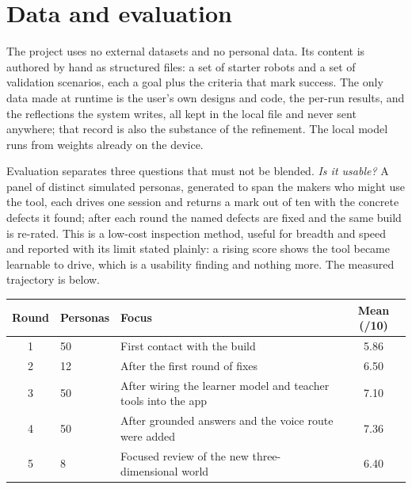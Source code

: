 \documentclass[10.5pt]{article}
\begin{document}
\section{Data and evaluation}
The project uses no external datasets and no personal data. Its content is authored by hand as structured files: a set of starter robots and a set of validation scenarios, each a goal plus the criteria that mark success. The only data made at runtime is the user's own designs and code, the per-run results, and the reflections the system writes, all kept in the local file and never sent anywhere; that record is also the substance of the refinement. The local model runs from weights already on the device.

Evaluation separates three questions that must not be blended. \emph{Is it usable?} A panel of distinct simulated personas, generated to span the makers who might use the tool, each drives one session and returns a mark out of ten with the concrete defects it found; after each round the named defects are fixed and the same build is re-rated. This is a low-cost inspection method, useful for breadth and speed and reported with its limit stated plainly: a rising score shows the tool became learnable to drive, which is a usability finding and nothing more. The measured trajectory is below.

\begin{table}[h]
\centering\small
\begin{tabular}{clp{7.2cm}c}
\toprule
Round & Personas & Focus & Mean (/10) \\
\midrule
1 & 50 & First contact with the build & 5.86 \\
2 & 12 & After the first round of fixes & 6.50 \\
3 & 50 & After wiring the learner model and teacher tools into the app & 7.10 \\
4 & 50 & After grounded answers and the voice route were added & 7.36 \\
5 & 8 & Focused review of the new three-dimensional world & 6.40 \\
\bottomrule
\end{tabular}
\end{table}
\end{document}
